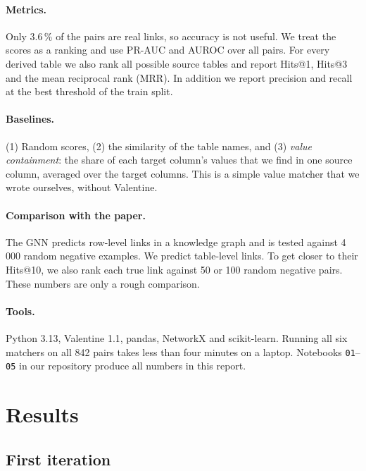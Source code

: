 \documentclass[11pt,a4paper]{article}
\begin{document}
\paragraph{Metrics.} Only 3.6\,\% of the pairs are real links, so accuracy is not useful. We treat the scores as a
ranking and use PR-AUC and AUROC over all pairs. For every derived table we also rank all possible source tables and
report Hits@1, Hits@3 and the mean reciprocal rank (MRR). In addition we report precision and recall at the best
threshold of the train split.

\paragraph{Baselines.} (1) Random scores, (2) the similarity of the table names, and (3) \emph{value containment}:
the share of each target column's values that we find in one source column, averaged over the target columns. This
is a simple value matcher that we wrote ourselves, without Valentine.

\paragraph{Comparison with the paper.} The GNN predicts row-level links in a knowledge graph and is tested against
4\,000 random negative examples. We predict table-level links. To get closer to their Hits@10, we also rank each
true link against 50 or 100 random negative pairs. These numbers are only a rough comparison.

\paragraph{Tools.} Python 3.13, Valentine 1.1, pandas, NetworkX and scikit-learn. Running all six matchers on all
842 pairs takes less than four minutes on a laptop. Notebooks \texttt{01}--\texttt{05} in our repository produce all
numbers in this report.

\section{Results}\label{sec:results}

\subsection{First iteration}\label{sec:res-first}
\end{document}
